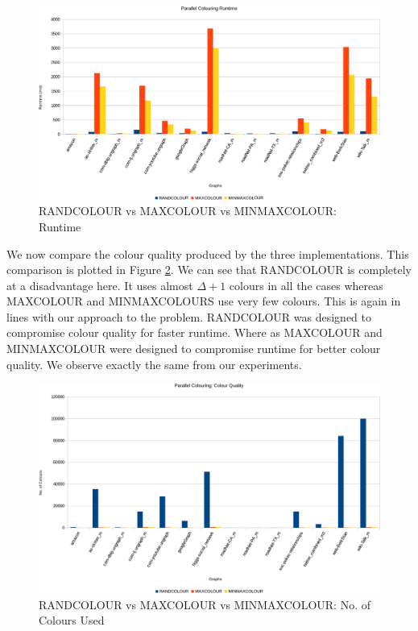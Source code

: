 \documentclass[MTech]{iitmdiss}
\begin{document}
\begin{figure}[h]
    \centering
    \includegraphics[width=\textwidth,keepaspectratio=true]{chartNewest4.pdf}
    \caption{
        RANDCOLOUR vs MAXCOLOUR vs MINMAXCOLOUR: Runtime
    }
    \label{fig:chart4}
\end{figure}

We now compare the colour quality produced by the three implementations. This comparison is plotted in Figure \ref{fig:chart5}. We can see that RANDCOLOUR is completely at a disadvantage here. It uses almost $\Delta+1$ colours in all the cases whereas MAXCOLOUR and MINMAXCOLOURS use very few colours. This is again in lines with our approach to the problem. RANDCOLOUR was designed to compromise colour quality for faster runtime. Where as MAXCOLOUR and MINMAXCOLOUR were designed to compromise runtime for better colour quality. We observe exactly the same from our experiments.

\begin{figure}[h]
    \centering
    \includegraphics[width=\textwidth,keepaspectratio=true]{chartNewest5.pdf}
    \caption{
        RANDCOLOUR vs MAXCOLOUR vs MINMAXCOLOUR: No. of Colours Used
    }
    \label{fig:chart5}
\end{figure}
\end{document}
